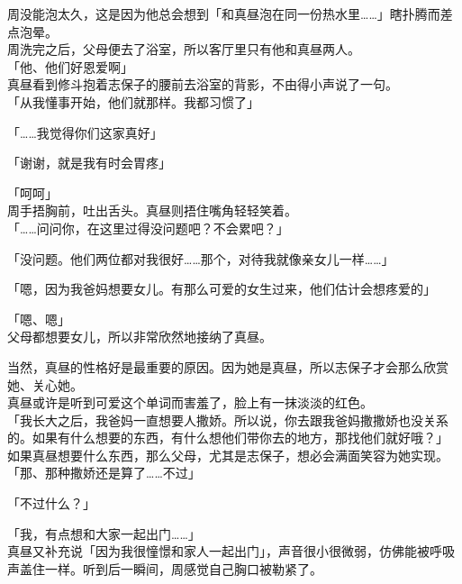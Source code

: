 周没能泡太久，这是因为他总会想到「和真昼泡在同一份热水里……」瞎扑腾而差点泡晕。\\

周洗完之后，父母便去了浴室，所以客厅里只有他和真昼两人。\\

「他、他们好恩爱啊」\\

真昼看到修斗抱着志保子的腰前去浴室的背影，不由得小声说了一句。\\

「从我懂事开始，他们就那样。我都习惯了」

「……我觉得你们这家真好」

「谢谢，就是我有时会胃疼」

「呵呵」\\

周手捂胸前，吐出舌头。真昼则捂住嘴角轻轻笑着。\\

「……问问你，在这里过得没问题吧？不会累吧？」

「没问题。他们两位都对我很好……那个，对待我就像亲女儿一样……」

「嗯，因为我爸妈想要女儿。有那么可爱的女生过来，他们估计会想疼爱的」

「嗯、嗯」\\

父母都想要女儿，所以非常欣然地接纳了真昼。

当然，真昼的性格好是最重要的原因。因为她是真昼，所以志保子才会那么欣赏她、关心她。\\

真昼或许是听到可爱这个单词而害羞了，脸上有一抹淡淡的红色。\\

「我长大之后，我爸妈一直想要人撒娇。所以说，你去跟我爸妈撒撒娇也没关系的。如果有什么想要的东西，有什么想他们带你去的地方，那找他们就好哦？」\\

如果真昼想要什么东西，那么父母，尤其是志保子，想必会满面笑容为她实现。\\

「那、那种撒娇还是算了……不过」

「不过什么？」

「我，有点想和大家一起出门……」\\

真昼又补充说「因为我很憧憬和家人一起出门」，声音很小很微弱，仿佛能被呼吸声盖住一样。听到后一瞬间，周感觉自己胸口被勒紧了。\\


